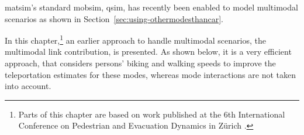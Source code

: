 \gls{matsim}'s standard \gls{mobsim}, \gls{qsim}, has recently been enabled to model \gls{multimodal} scenarios as shown in Section~\ref{sec:using-othermodesthancar}. %

In this chapter,\footnote{Parts of this chapter are based on work published at the 6th International Conference on Pedestrian and Evacuation Dynamics in Zürich \cite{00DoblerLaemmelAxhausen2012PedMultiModal}.}
 an earlier approach to handle \gls{multimodal} scenarios, the \gls{multimodal} link \gls{contribution}, is presented. As shown below, it is a very efficient approach, that considers persons' biking and walking speeds to improve the \gls{teleportation} estimates for these modes, whereas mode interactions are not taken into account. 


